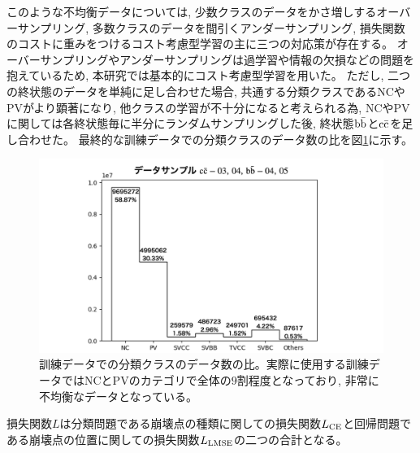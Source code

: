 このような不均衡データについては, 少数クラスのデータをかさ増しするオーバーサンプリング, 多数クラスのデータを間引くアンダーサンプリング, 損失関数のコストに重みをつけるコスト考慮型学習の主に三つの対応策が存在する。
オーバーサンプリングやアンダーサンプリングは過学習や情報の欠損などの問題を抱えているため, 本研究では基本的にコスト考慮型学習を用いた。
ただし, 二つの終状態のデータを単純に足し合わせた場合, 共通する分類クラスであるNCやPVがより顕著になり, 他クラスの学習が不十分になると考えられる為, NCやPVに関しては各終状態毎に半分にランダムサンプリングした後, 終状態$\rm b\bar{b}$と$\rm c\bar{c}$を足し合わせた。
最終的な訓練データでの分類クラスのデータ数の比を図\ref{3-3-2-2ImbalancedData}に示す。

\begin{figure}[htbp]
 \centering
 \includegraphics[width=1.0\textwidth]{Figure/3Networks/3-3-2-2ImbalancedData.png}
 \caption[訓練データでの分類クラスのデータ数の比]{訓練データでの分類クラスのデータ数の比。実際に使用する訓練データではNCとPVのカテゴリで全体の$9$割程度となっており, 非常に不均衡なデータとなっている。}
 \label{3-3-2-2ImbalancedData}
\end{figure}

損失関数$L$は分類問題である崩壊点の種類に関しての損失関数$L_{\rm CE}$と回帰問題である崩壊点の位置に関しての損失関数$L_{\rm LMSE}$の二つの合計となる。


